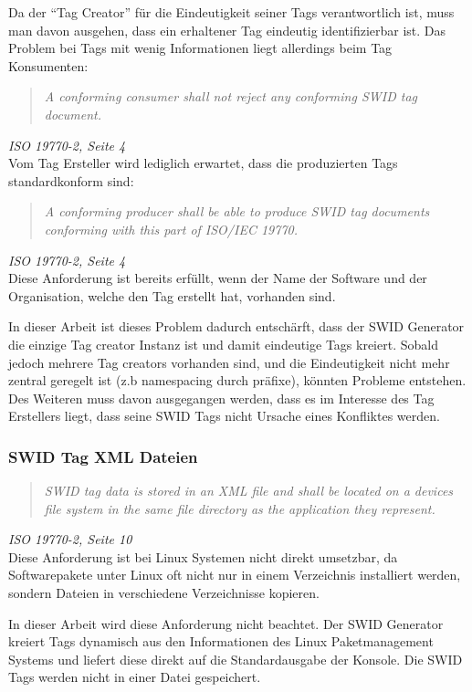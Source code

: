 Da der \enquote{Tag Creator} für die Eindeutigkeit seiner Tags verantwortlich
ist, muss man davon ausgehen, dass ein erhaltener Tag eindeutig identifizierbar
ist. Das Problem bei Tags mit wenig Informationen liegt allerdings beim Tag
Konsumenten:
\begin{quote}
\textit{A conforming consumer shall not reject any conforming SWID tag
document.}
\end{quote}
\textit{ISO 19770-2\cite{iso19770-2}, Seite 4}\\

Vom Tag Ersteller wird lediglich erwartet, dass die produzierten Tags
standardkonform sind:
\begin{quote}
\textit{A conforming producer shall be able to produce SWID tag documents
conforming with this part of ISO/IEC 19770.}
\end{quote}
\textit{ISO 19770-2\cite{iso19770-2}, Seite 4}\\

Diese Anforderung ist bereits erfüllt, wenn der Name der Software und der
Organisation, welche den Tag erstellt hat, vorhanden sind.

In dieser Arbeit ist dieses Problem dadurch entschärft, dass der SWID Generator
die einzige Tag creator Instanz ist und damit eindeutige Tags kreiert. Sobald
jedoch mehrere Tag creators vorhanden sind, und die Eindeutigkeit nicht mehr
zentral geregelt ist (z.b namespacing durch präfixe), könnten Probleme
entstehen. Des Weiteren muss davon ausgegangen werden, dass es im Interesse des
Tag Erstellers liegt, dass seine SWID Tags nicht Ursache eines Konfliktes
werden.

\subsubsection{SWID Tag XML Dateien}
\begin{quote}
\textit{SWID tag data is stored in an XML file and shall be located on a devices
file system in the same file directory as the application they represent.}
\end{quote}
\textit{ISO 19770-2\cite{iso19770-2}, Seite 10}\\

Diese Anforderung ist bei Linux Systemen nicht direkt umsetzbar, da
Softwarepakete unter Linux oft nicht nur in einem Verzeichnis installiert
werden, sondern Dateien in verschiedene Verzeichnisse kopieren.

In dieser Arbeit wird diese Anforderung nicht beachtet. Der SWID Generator
kreiert Tags dynamisch aus den Informationen des Linux Paketmanagement Systems
und liefert diese direkt auf die Standardausgabe der Konsole. Die SWID Tags
werden nicht in einer Datei gespeichert. 

